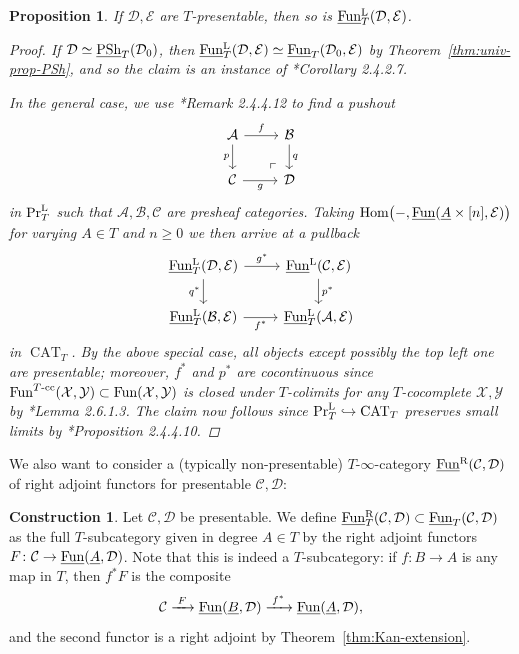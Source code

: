 \documentclass[reqno]{memo-l}
\theoremstyle{mythm}
\newtheorem{prop}[thm]{Proposition}
\theoremstyle{definition}
\newtheorem{constr}[thm]{Construction}
\numberwithin{equation}{section}
\newcommand{\Aa}{{\mathcal{A}}}
\newcommand{\Bb}{{\mathcal{B}}}
\newcommand{\Cc}{{\mathcal{C}}}
\newcommand{\Dd}{{\mathcal{D}}}
\newcommand{\Ee}{{\mathcal{E}}}
\newcommand{\Xx}{{\mathcal X}}
\newcommand{\Yy}{{\mathcal Y}}
\DeclareMathOperator{\CAT}{CAT}
\newcommand{\PrLT}{\textup{Pr}^{\textup{L}}_{T}}
\renewcommand{\hom}{\textup{hom}}
\newcommand{\Fun}{{\textup{Fun}}}
\DeclareMathOperator{\PSh}{PSh}
\renewcommand{\hom}{{\textup{Hom}}}
\newcommand{\ulhelper}[2]{\underline{\setbox0=\hbox{$#1#2$}\dp0=0.4pt \box0\relax}}
\newcommand{\ul}[1]{{\mathpalette\ulhelper{#1}}\hbox{\rule[-2pt]{0pt}{0pt}}}
\begin{document}
\begin{prop}\label{prop:FunL-presentable}
    If $\Dd,\Ee$ are $T$-presentable, then so is $\ul\Fun_T^\textup{L}(\Dd,\Ee)$.
    \begin{proof}
        If $\Dd\simeq\ul\PSh_T(\Dd_0)$, then $\ul\Fun_T^\textup{L}(\Dd,\Ee)\simeq\ul\Fun_T(\Dd_0,\Ee)$ by Theorem~\ref{thm:univ-prop-PSh}, and so the claim is an instance of \cite{martiniwolf2022presentable}*{Corollary 2.4.2.7}.

        In the general case, we use \cite{martiniwolf2022presentable}*{Remark 2.4.4.12} to find a pushout
        \[
            \begin{tikzcd}
                \Aa\arrow[r, "f"]\arrow[dr,"\ulcorner"{very near end},phantom]\arrow[d,"p"'] & \Bb\arrow[d,"q"]\\
                \Cc\arrow[r,"g"'] & \Dd
            \end{tikzcd}
        \]
        in $\PrLT$ such that $\Aa,\Bb,\Cc$ are presheaf categories. Taking $\hom\big(-,\ul\Fun(\ul A\times[n],\Ee)\big)$ for varying $A\in T$ and $n\ge 0$ we then arrive at a pullback
        \[
            \begin{tikzcd}
                \ul\Fun_T^\text{L}(\Dd,\Ee)\arrow[r,"g^*"]\arrow[d,"q^*"'] & \ul\Fun^\text{L}(\Cc,\Ee)\arrow[d,"p^*"]\\
                \ul\Fun_T^\text{L}(\Bb,\Ee)\arrow[r,"f^*"'] & \ul\Fun_T^\text{L}(\Aa,\Ee)
            \end{tikzcd}
        \]
        in $\CAT_T$. By the above special case, all objects except possibly the top left one are presentable; moreover, $f^*$ and $p^*$ are cocontinuous since $\Fun^\text{$T$-cc}(\Xx,\Yy)\subset\Fun(\Xx,\Yy)$ is closed under $T$-colimits for any $T$-cocomplete $\Xx,\Yy$ by \cite{martiniwolf2022presentable}*{Lemma 2.6.1.3}. The claim now follows since $\PrLT\hookrightarrow\CAT_T$ preserves small limits by \cite{martiniwolf2022presentable}*{Proposition 2.4.4.10}.
    \end{proof}
\end{prop}

We also want to consider a (typically non-presentable) $T$-$\infty$-category $\ul\Fun^\text{R}(\Cc,\Dd)$ of right adjoint functors for presentable $\Cc,\Dd$:

\begin{constr}
    Let $\Cc,\Dd$ be presentable. We define $\ul\Fun_T^\text{R}(\Cc,\Dd)\subset\ul\Fun_T(\Cc,\Dd)$ as the full $T$-subcategory given in degree $A\in T$ by the right adjoint functors $F\colon\Cc\to\ul\Fun(\ul A,\Dd)$. Note that this is indeed a $T$-subcategory: if $f\colon B\to A$ is any map in $T$, then $f^*F$ is the composite
    \[
        \Cc\xrightarrow{\;F\;}\ul\Fun(\ul B,\Dd)\xrightarrow{\;f^*\;}\ul\Fun(\ul A,\Dd),
    \]
    and the second functor is a right adjoint by Theorem~\ref{thm:Kan-extension}.
\end{constr}
\end{document}
